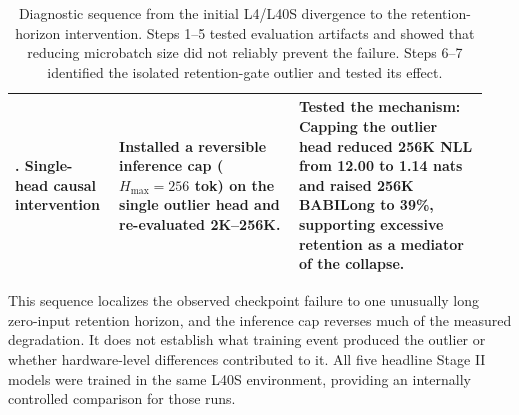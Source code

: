 \begin{table}[!ht]
\begin{tabular}{>{\raggedright\arraybackslash}p{0.20\linewidth}>{\raggedright\arraybackslash}p{0.36\linewidth}>{\raggedright\arraybackslash}p{0.38\linewidth}}
7. Single-head causal intervention & Installed a reversible inference cap ($H_{\max} = 256$ tok) on the single outlier head and re-evaluated 2K--256K. & \textbf{Tested the mechanism:} Capping the outlier head reduced 256K NLL from 12.00 to 1.14 nats and raised 256K BABILong to 39\%, supporting excessive retention as a mediator of the collapse. \\
\bottomrule
\end{tabular}
\caption{Diagnostic sequence from the initial L4/L40S divergence to the retention-horizon intervention. Steps 1--5 tested evaluation artifacts and showed that reducing microbatch size did not reliably prevent the failure. Steps 6--7 identified the isolated retention-gate outlier and tested its effect.}
\label{table:environment_diagnostic_journey}
\end{table}

This sequence localizes the observed checkpoint failure to one unusually long zero-input retention horizon, and the inference cap reverses much of the measured degradation. It does not establish what training event produced the outlier or whether hardware-level differences contributed to it. All five headline Stage II models were trained in the same L40S environment, providing an internally controlled comparison for those runs.
